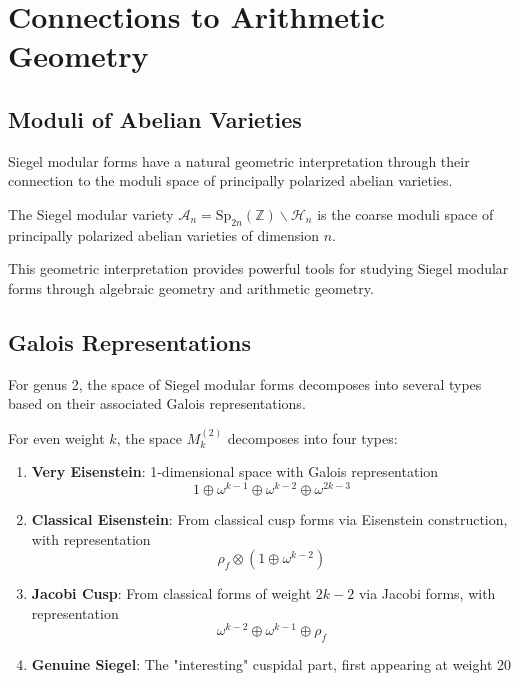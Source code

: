 \section{Connections to Arithmetic Geometry}
\label{sec:arithmetic_geometry}

\subsection{Moduli of Abelian Varieties}

Siegel modular forms have a natural geometric interpretation through their connection to the moduli space of principally polarized abelian varieties.

\begin{theorem}
\label{thm:siegel_moduli}
The Siegel modular variety $\mathcal{A}_n = \mathrm{Sp}_{2n}(\mathbb{Z}) \backslash \mathcal{H}_n$ is the coarse moduli space of principally polarized abelian varieties of dimension $n$.
\end{theorem}

This geometric interpretation provides powerful tools for studying Siegel modular forms through algebraic geometry and arithmetic geometry.

\subsection{Galois Representations}

For genus 2, the space of Siegel modular forms decomposes into several types based on their associated Galois representations.

\begin{theorem}
\label{thm:galois_decomposition}
For even weight $k$, the space $M_k^{(2)}$ decomposes into four types:

\begin{enumerate}
\item \textbf{Very Eisenstein}: 1-dimensional space with Galois representation
\begin{equation}
1 \oplus \omega^{k-1} \oplus \omega^{k-2} \oplus \omega^{2k-3}
\end{equation}

\item \textbf{Classical Eisenstein}: From classical cusp forms via Eisenstein construction, with representation
\begin{equation}
\rho_f \otimes (1 \oplus \omega^{k-2})
\end{equation}

\item \textbf{Jacobi Cusp}: From classical forms of weight $2k-2$ via Jacobi forms, with representation
\begin{equation}
\omega^{k-2} \oplus \omega^{k-1} \oplus \rho_f
\end{equation}

\item \textbf{Genuine Siegel}: The "interesting" cuspidal part, first appearing at weight 20
\end{enumerate}
\end{theorem}

